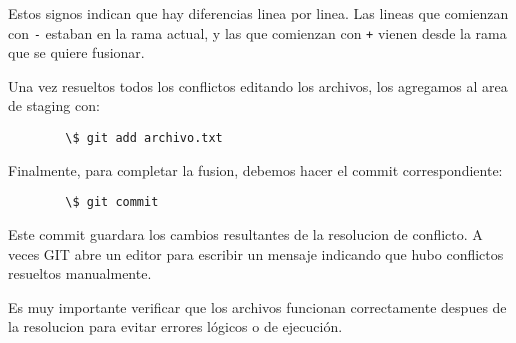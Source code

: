     Estos signos indican que hay diferencias linea por linea. Las lineas que comienzan con \texttt{-} estaban en la rama actual, y las que comienzan con \texttt{+} vienen desde la rama que se quiere fusionar.

    Una vez resueltos todos los conflictos editando los archivos, los agregamos al area de staging con:

    \begin{lstlisting}
        \$ git add archivo.txt
    \end{lstlisting}

    Finalmente, para completar la fusion, debemos hacer el commit correspondiente:

    \begin{lstlisting}
        \$ git commit
    \end{lstlisting}

    Este commit guardara los cambios resultantes de la resolucion de conflicto. A veces GIT abre un editor para escribir un mensaje indicando que hubo conflictos resueltos manualmente.

    Es muy importante verificar que los archivos funcionan correctamente despues de la resolucion para evitar errores l\'ogicos o de ejecuci\'on.